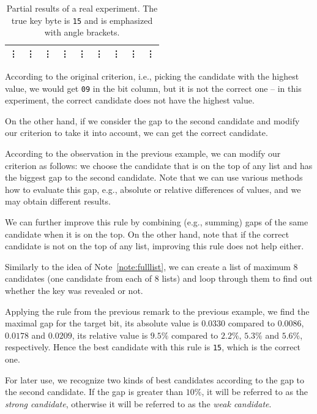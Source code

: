 \begin{example}
\begin{table}[h]
\begin{center}
\begin{tabular}{| c | c | c | c | c | c | c | c | c |}
					\vdots & \vdots & \vdots     & \vdots & \vdots     & \vdots & \vdots     & \vdots & \vdots     \\
				\hline
			\end{tabular}
			\end{center}
		\caption{Partial results of a real experiment. The true key byte is {\tt 15} and is emphasized with angle brackets.}
		\label{tab:gap}
		\end{table}
		According to the original criterion, i.e., picking the candidate with the highest value, we would get {\tt 09} in the  bit column, but it is not the correct one -- in this experiment, the correct candidate does not have the highest value.
		
		On the other hand, if we consider the gap to the second candidate and modify our criterion to take it into account, we can get the correct candidate.
	\end{example}
	
	\begin{remark}
	\label{rem:gap}
		According to the observation in the previous example, we can modify our criterion as follows: we choose the candidate that is on the top of any list and has the biggest gap to the second candidate. Note that we can use various methods how to evaluate this gap, e.g., absolute or relative differences of values, and we may obtain different results.
		
		We can further improve this rule by combining (e.g., summing) gaps of the same candidate when it is on the top. On the other hand, note that if the correct candidate is not on the top of any list, improving this rule does not help either.
		
		Similarly to the idea of Note~\ref{note:fulllist}, we can create a list of maximum $8$ candidates (one candidate from each of $8$ lists) and loop through them to find out whether the key was revealed or not.
	\end{remark}
	
	Applying the rule from the previous remark to the previous example, we find the maximal gap for the  target bit, its absolute value is $0.0330$ compared to $0.0086$, $0.0178$ and $0.0209$, its relative value is $9.5\%$ compared to $2.2\%$, $5.3\%$ and $5.6\%$, respectively. Hence the best candidate with this rule is {\tt 15}, which is the correct one.
	
	\begin{note}
	\label{note:strong}
		For later use, we recognize two kinds of best candidates according to the gap to the second candidate. If the gap is greater than $10\%$, it will be referred to as the {\em strong candidate}, otherwise it will be referred to as the {\em weak candidate}.
	\end{note}